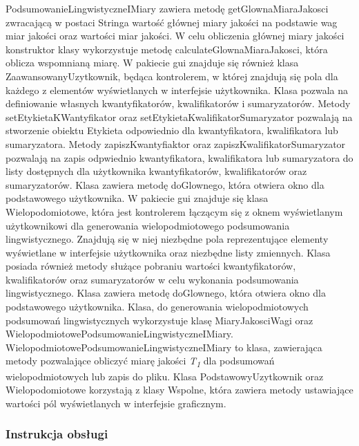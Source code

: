 \documentclass{classrep}
\begin{document}
PodsumowanieLingwistyczneIMiary zawiera metodę getGlownaMiaraJakosci zwracającą w postaci Stringa wartość głównej miary jakości na podstawie wag miar jakości oraz wartości miar jakości. W celu obliczenia głównej miary jakości konstruktor klasy wykorzystuje metodę calculateGlownaMiaraJakosci, która oblicza wspomnianą miarę. W pakiecie gui znajduje się również klasa ZaawansowanyUzytkownik, będąca kontrolerem, w której znajdują się pola dla każdego z elementów wyświetlanych w interfejsie użytkownika. Klasa pozwala na definiowanie własnych kwantyfikatorów, kwalifikatorów i sumaryzatorów. Metody setEtykietaKWantyfikator oraz setEtykietaKwalifikatorSumaryzator pozwalają na stworzenie obiektu Etykieta odpowiednio dla kwantyfikatora, kwalifikatora lub sumaryzatora. Metody zapiszKwantyfiaktor oraz zapiszKwalifikatorSumaryzator pozwalają na zapis odpwiednio kwantyfikatora, kwalifikatora lub sumaryzatora do listy dostępnych dla użytkownika kwantyfikatorów, kwalifikatorów oraz sumaryzatorów. Klasa zawiera metodę doGlownego, która otwiera okno dla podstawowego użytkownika. W pakiecie gui znajduje się klasa Wielopodomiotowe, która jest kontrolerem łączącym się z oknem wyświetlanym użytkownikowi dla generowania wielopodmiotowego podsumowania lingwistycznego. Znajdują się w niej niezbędne pola reprezentujące elementy wyświetlane w interfejsie użytkownika oraz niezbędne listy zmiennych. Klasa posiada również metody służące pobraniu wartości kwantyfikatorów, kwalifikatorów oraz sumaryzatorów w celu wykonania podsumowania lingwistycznego. Klasa zawiera metodę doGlownego, która otwiera okno dla podstawowego użytkownika. Klasa, do generowania wielopodmiotowych podsumowań lingwistycznych wykorzystuje klasę MiaryJakosciWagi oraz WielopodmiotowePodsumowanieLingwistyczneIMiary. WielopodmiotowePodsumowanieLingwistyczneIMiary to klasa, zawierająca metody pozwalające obliczyć miarę jakości \textit{T\textsubscript{1}} dla podsumowań wielopodmiotowych lub zapis do pliku. Klasa PodstawowyUzytkownik oraz Wielopodomiotowe korzystają z klasy Wspolne, która zawiera metody ustawiające wartości pól wyświetlanych w interfejsie graficznym.


\newpage


\subsubsection{Instrukcja obsługi}
\end{document}

